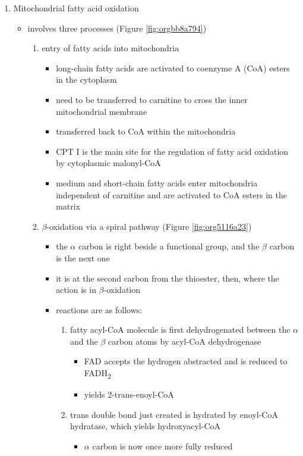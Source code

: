 \documentclass{scrartcl}
\begin{document}
\begin{enumerate}
\item Mitochondrial fatty acid oxidation
\label{sec:org9a16273}

\begin{itemize}
\item involves three processes (Figure \ref{fig:orgbb8a794})
\begin{enumerate}
\item entry of fatty acids into mitochondria
\begin{itemize}
\item long-chain fatty acids are activated to coenzyme A (CoA) esters
in the cytoplasm
\item need to be transferred to carnitine to cross the inner
mitochondrial membrane
\item transferred back to CoA within the mitochondria
\item CPT I is the main site for the regulation of fatty acid
oxidation by cytoplasmic malonyl-CoA
\item medium and short-chain fatty acids enter mitochondria
independent of carnitine and are activated to CoA esters in the
matrix
\end{itemize}
\item \(\beta\)-oxidation via a spiral pathway (Figure \ref{fig:org5116a23})
\begin{itemize}
\item the \(\alpha\) carbon is right beside a functional group, and the
\(\beta\) carbon is the next one
\item it is at the second carbon from the thioester, then, where the
action is in \(\beta\)-oxidation
\item reactions are as follows:
\begin{enumerate}
\item fatty acyl-CoA molecule is first dehydrogenated between the \(\alpha\)
and the \(\beta\) carbon atoms by acyl-CoA dehydrogenase
\begin{itemize}
\item FAD accepts the hydrogen abstracted and is reduced to FADH\textsubscript{2}
\item yields 2-trans-enoyl-CoA
\end{itemize}
\item trans double bond just created is hydrated by enoyl-CoA
hydratase, which yields hydroxyacyl-CoA
\begin{itemize}
\item \(\alpha\) carbon is now once more fully reduced

\end{itemize}
\end{enumerate}
\end{itemize}
\end{enumerate}
\end{itemize}
\end{enumerate}
\end{document}
